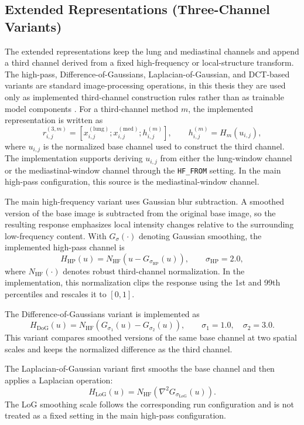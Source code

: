 \subsection{Extended Representations (Three-Channel Variants)}
\label{sec:extended_representations_three_channel}
The extended representations keep the lung and mediastinal channels and append a third channel derived from a fixed high-frequency or local-structure transform. The high-pass, Difference-of-Gaussians, Laplacian-of-Gaussian, and DCT-based variants are standard image-processing operations, in this thesis they are used only as implemented third-channel construction rules rather than as trainable model components \cite{gonzalez2018digital}. For a third-channel method \(m\), the implemented representation is written as
\[
r_{i,j}^{(3,m)}
=
\left[
x_{i,j}^{(\mathrm{lung})};
x_{i,j}^{(\mathrm{med})};
h_{i,j}^{(m)}
\right],
\qquad
h_{i,j}^{(m)}
=
H_m(u_{i,j}),
\]
where \(u_{i,j}\) is the normalized base channel used to construct the third channel. The implementation supports deriving \(u_{i,j}\) from either the lung-window channel or the mediastinal-window channel through the \texttt{HF\_FROM} setting. In the main high-pass configuration, this source is the mediastinal-window channel.

The main high-frequency variant uses Gaussian blur subtraction. A smoothed version of the base image is subtracted from the original base image, so the resulting response emphasizes local intensity changes relative to the surrounding low-frequency content. With \(G_{\sigma}(\cdot)\) denoting Gaussian smoothing, the implemented high-pass channel is
\[
H_{\mathrm{HP}}(u)
=
N_{\mathrm{HF}}\!\left(u-G_{\sigma_{\mathrm{HP}}}(u)\right),
\qquad
\sigma_{\mathrm{HP}}=2.0,
\]
where \(N_{\mathrm{HF}}(\cdot)\) denotes robust third-channel normalization. In the implementation, this normalization clips the response using the 1st and 99th percentiles and rescales it to \([0,1]\).

The Difference-of-Gaussians variant is implemented as
\[
H_{\mathrm{DoG}}(u)
=
N_{\mathrm{HF}}\!\left(
G_{\sigma_1}(u)-G_{\sigma_2}(u)
\right),
\qquad
\sigma_1=1.0,\quad
\sigma_2=3.0.
\]
This variant compares smoothed versions of the same base channel at two spatial scales and keeps the normalized difference as the third channel.

The Laplacian-of-Gaussian variant first smooths the base channel and then applies a Laplacian operation:
\[
H_{\mathrm{LoG}}(u)
=
N_{\mathrm{HF}}\!\left(
\nabla^2 G_{\sigma_{\mathrm{LoG}}}(u)
\right).
\]
The LoG smoothing scale follows the corresponding run configuration and is not treated as a fixed setting in the main high-pass configuration.

